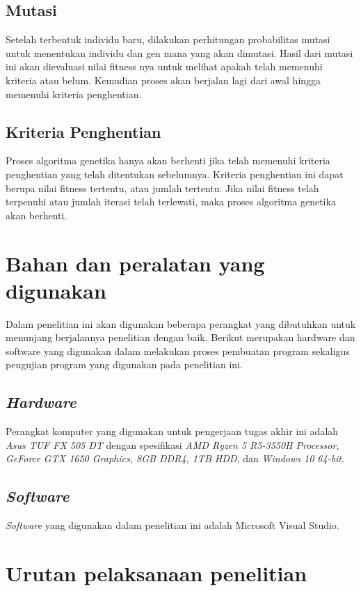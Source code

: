  \subsection{Mutasi}
  
  Setelah terbentuk individu baru, dilakukan perhitungan probabilitas mutasi untuk menentukan individu dan gen mana yang akan dimutasi. 
  Hasil dari mutasi ini akan dievaluasi nilai fitness nya untuk melihat apakah telah memenuhi kriteria atau belum. Kemudian proses akan berjalan lagi dari awal hingga memenuhi kriteria penghentian.
  
  \subsection{Kriteria Penghentian}
  
  Proses algoritma genetika hanya akan berhenti jika telah memenuhi kriteria penghentian yang telah ditentukan sebelumnya. 
  Kriteria penghentian ini dapat berupa nilai fitness tertentu, atau jumlah tertentu. 
  Jika nilai fitness telah terpenuhi atau jumlah iterasi telah terlewati, maka proses algoritma genetika akan berhenti.

\section{Bahan dan peralatan yang digunakan}
Dalam penelitian ini akan digunakan beberapa perangkat yang dibutuhkan untuk menunjang berjalannya penelitian dengan baik.
Berikut merupakan hardware dan software yang digunakan dalam melakukan proses pembuatan program sekaligus pengujian program yang digunakan pada penelitian ini.
\subsection{\emph{Hardware}}
Perangkat komputer yang digunakan untuk pengerjaan tugas akhir ini adalah \emph{Asus TUF FX 505 DT} dengan spesifikasi \emph{AMD Ryzen 5 R5-3550H Processor, GeForce GTX 1650 Graphics, 8GB DDR4, 1TB HDD,} dan \emph{Windows 10 64-bit}.
\subsection{\emph{Software}}
\emph{Software} yang digunakan dalam penelitian ini adalah Microsoft Visual Studio.


\section{Urutan pelaksanaan penelitian}

